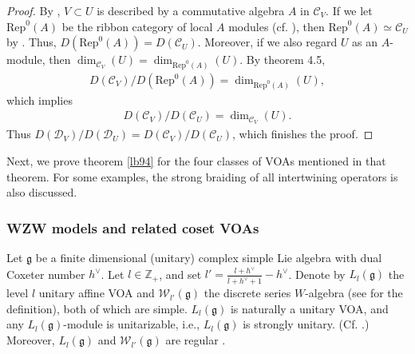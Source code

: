 \documentclass[12pt,a4paper]{article}
\theoremstyle{definition}
\theoremstyle{plain}
\newcommand{\mc}{\mathcal}
\newcommand{\Rep}{\mathrm{Rep}}
\newcommand{\gk}{\mathfrak g}
\newcommand{\mbb}{\mathbb}
\numberwithin{equation}{subsection}
\begin{document}
\begin{proof}
By \cite{HKL15}, $V\subset U$ is described by a commutative algebra $A$ in $\mc C_V$. If we let $\Rep^0(A)$ be the ribbon category  of local $A$ modules (cf. \cite{KO02}), then $\Rep^0(A)\simeq \mc C_U$ by \cite{CKR17}. Thus, $D(\Rep^0(A))=D(\mc C_U)$. Moreover, if we also regard $U$ as an $A$-module, then $\dim_{\mc C_V}(U)=\dim_{\Rep^0(A)}(U)$. By \cite{KO02} theorem 4.5,
\begin{align*}
D(\mc C_V)/D(\Rep^0(A))=\dim_{\Rep^0(A)}(U),
\end{align*}
which implies
\begin{align*}
D(\mc C_V)/D(\mc C_U)=\dim_{\mc C_V}(U).
\end{align*}
Thus $D(\mc D_V)/D(\mc D_U)=D(\mc C_V)/D(\mc C_U)$, which finishes the proof.
\end{proof}








Next, we prove theorem \ref{lb94} for the four classes of VOAs mentioned in that theorem. For some examples, the strong braiding of all intertwining operators is also discussed.

\subsubsection*{WZW models and related coset VOAs}











































Let $\gk$ be a finite dimensional (unitary) complex simple Lie algebra with dual Coxeter number $h^\vee$. Let  $l\in\mbb Z_+$, and set $l'=\frac{l+h^\vee}{l+h^\vee+1}-h^\vee$. Denote by $L_l(\gk)$ the level $l$ unitary affine VOA and $\mc W_{l'}(\gk)$ the discrete series $W$-algebra (see \cite{ACL19} for the definition), both of which are simple.   $L_l(\gk)$ is naturally a unitary VOA, and any $L_l(\gk)$-module is unitarizable, i.e., $L_l(\gk)$ is strongly unitary. (Cf. \cite{Kac90,DL14,CKLW18,Gui19c}.) Moreover, $L_l(\gk)$ and $\mc W_{l'}(\gk)$ are regular \cite{DLM97,Ara15a,Ara15b}.
\end{document}
